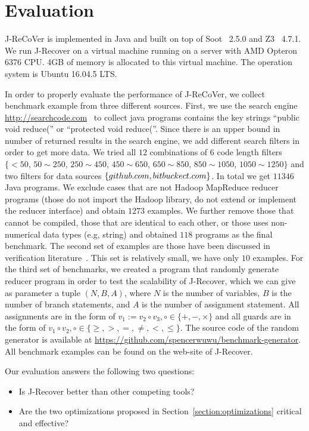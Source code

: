 \documentclass{llncs}
\begin{document}
\section{Evaluation}
\label{section:exp}
J-ReCoVer is implemented in Java and built on top of Soot~\cite{soot} 2.5.0 and Z3~\cite{z3} 4.7.1. We run J-Recover on a virtual machine running on a server with AMD Opteron 6376 CPU. 4GB of memory is allocated to this virtual machine. The operation system is Ubuntu 16.04.5 LTS. 


In order to properly evaluate the performance of J-ReCoVer, we collect benchmark example from three different sources. 
First, we use the search engine \url{http://searchcode.com}~\cite{searchcode} to collect java programs contains the key strings ``public void reduce('' or ``protected void reduce(''.  Since there is an upper bound in number of returned results in the search engine, we add different search filters in order to get more data. We tried all $12$ combinations of $6$ code length filters $\{<50$, $ 50\sim 250$, $250\sim 450$, $450\sim 650$, $650\sim 850$, $850\sim 1050$, $1050\sim 1250\}$ 
and two filters for data sources $\{github.com, bitbuckect.com\}$. In total we get $11346$ Java programs. We exclude cases that are not Hadoop MapReduce reducer programs (those do not import the Hadoop library, do not extend or implement the reducer interface) and obtain $1273$ examples. We further remove those that cannot be compiled, those that are identical to each other, or those uses non-numerical data types (e.g, string) and obtained $118$ programs as the final benchmark.
The second set of examples are those have been discussed in verification literature~\cite{ChenHSW15,ChenSW16,SmithA16}. This set is relatively small, we have only $10$ examples. 
For the third set of benchmarks, we created a program that randomly generate reducer program in order to test the scalability of J-Recover, which we can give as parameter a tuple $(N,B,A)$, where $N$ is the number of variables, $B$ is the number of branch statements, and $A$ is the number of assignment statement. All assignments are in the form of $v_1 := v_2\circ v_3,\circ\in\{+,-,\times\}$ and all guards are in the form of $v_1 \circ v_2, \circ\in\{\geq, >,=, \neq, <,\leq \}$.
 The source code of the random generator is available at \url{https://github.com/spencerwuwu/benchmark-generator}.
All benchmark examples can be found on the web-site of J-Recover.

Our evaluation answers the following two questions:
\begin{itemize}
	\item Is J-Recover better than other competing tools?
	\item Are the two optimizations proposed in Section~\ref{section:optimizations} critical and effective?
\end{itemize} 
\end{document}
